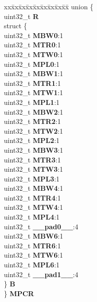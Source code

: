 \begin{DoxyCompactItemize}
\begin{tabbing}
\end{tabbing}\item 
\mbox{\label{structPBRIDGE__A__tag_a73e22dcfce2c0b606614d34e75f3b88a}} 
\begin{tabbing}
xx\=xx\=xx\=xx\=xx\=xx\=xx\=xx\=xx\=\kill
union \{\\
\>uint32\_t {\bfseries R}\\
\>struct \{\\
\>\>uint32\_t {\bfseries MBW0}:1\\
\>\>uint32\_t {\bfseries MTR0}:1\\
\>\>uint32\_t {\bfseries MTW0}:1\\
\>\>uint32\_t {\bfseries MPL0}:1\\
\>\>uint32\_t {\bfseries MBW1}:1\\
\>\>uint32\_t {\bfseries MTR1}:1\\
\>\>uint32\_t {\bfseries MTW1}:1\\
\>\>uint32\_t {\bfseries MPL1}:1\\
\>\>uint32\_t {\bfseries MBW2}:1\\
\>\>uint32\_t {\bfseries MTR2}:1\\
\>\>uint32\_t {\bfseries MTW2}:1\\
\>\>uint32\_t {\bfseries MPL2}:1\\
\>\>uint32\_t {\bfseries MBW3}:1\\
\>\>uint32\_t {\bfseries MTR3}:1\\
\>\>uint32\_t {\bfseries MTW3}:1\\
\>\>uint32\_t {\bfseries MPL3}:1\\
\>\>uint32\_t {\bfseries MBW4}:1\\
\>\>uint32\_t {\bfseries MTR4}:1\\
\>\>uint32\_t {\bfseries MTW4}:1\\
\>\>uint32\_t {\bfseries MPL4}:1\\
\>\>uint32\_t {\bfseries \_\_pad0\_\_}:4\\
\>\>uint32\_t {\bfseries MBW6}:1\\
\>\>uint32\_t {\bfseries MTR6}:1\\
\>\>uint32\_t {\bfseries MTW6}:1\\
\>\>uint32\_t {\bfseries MPL6}:1\\
\>\>uint32\_t {\bfseries \_\_pad1\_\_}:4\\
\>\} {\bfseries B}\\
\} {\bfseries MPCR}\\


\end{tabbing}
\end{DoxyCompactItemize}
